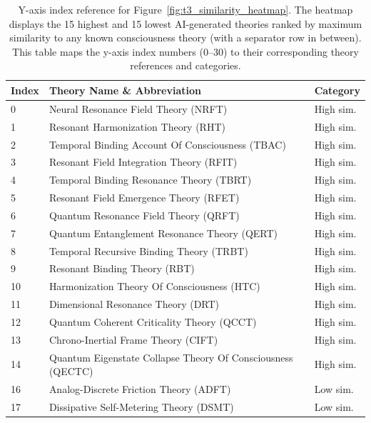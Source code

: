 \begin{table}[htbp]
  \centering
  \begin{footnotesize}
  \caption{Y-axis index reference for Figure~\ref{fig:t3_similarity_heatmap}. The heatmap displays the 15 highest and 15 lowest AI-generated theories ranked by maximum similarity to any known consciousness theory (with a separator row in between). This table maps the y-axis index numbers (0--30) to their corresponding theory references and categories.}
  \label{tab:t3_heatmap_y_axis_reference}
  \begin{tabularx}{\textwidth}{@{}>{{\raggedright\arraybackslash}}p{0.8cm} Y >{{\raggedright\arraybackslash}}p{2.0cm}@{}}
    \toprule
    \textbf{Index} & \textbf{Theory Name \& Abbreviation} & \textbf{Category} \\
     & Neural Resonance Field Theory (NRFT) & High sim. \\
    1 & Resonant Harmonization Theory (RHT) & High sim. \\
    2 & Temporal Binding Account Of Consciousness (TBAC) & High sim. \\
    3 & Resonant Field Integration Theory (RFIT) & High sim. \\
    4 & Temporal Binding Resonance Theory (TBRT) & High sim. \\
    5 & Resonant Field Emergence Theory (RFET) & High sim. \\
    6 & Quantum Resonance Field Theory (QRFT) & High sim. \\
    7 & Quantum Entanglement Resonance Theory (QERT) & High sim. \\
    8 & Temporal Recursive Binding Theory (TRBT) & High sim. \\
    9 & Resonant Binding Theory (RBT) & High sim. \\
    10 & Harmonization Theory Of Consciousness (HTC) & High sim. \\
    11 & Dimensional Resonance Theory (DRT) & High sim. \\
    12 & Quantum Coherent Criticality Theory (QCCT) & High sim. \\
    13 & Chrono-Inertial Frame Theory (CIFT) & High sim. \\
    14 & Quantum Eigenstate Collapse Theory Of Consciousness (QECTC) & High sim. \\
    16 & Analog-Discrete Friction Theory (ADFT) & Low sim. \\
    17 & Dissipative Self-Metering Theory (DSMT) & Low sim. \\

\end{tabularx}
\end{footnotesize}
\end{table}
